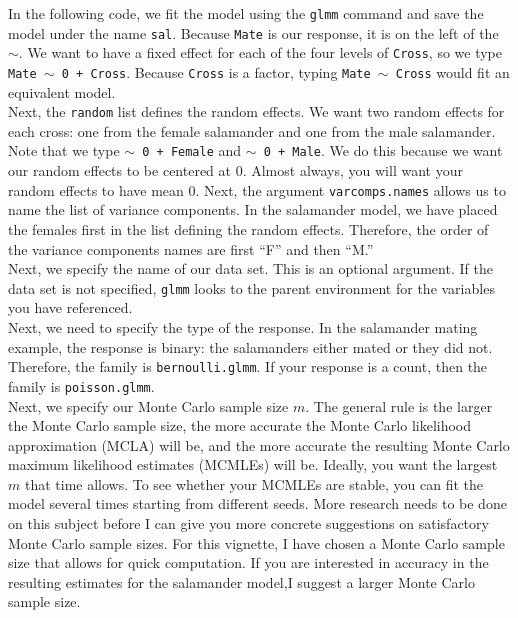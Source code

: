 \documentclass[11pt]{article}\usepackage[]{graphicx}\usepackage[]{color}
\begin{document}
In the following code, we  fit the model using the \texttt{glmm} command and save the model under the name  \texttt{sal}. Because \texttt{Mate} is our response, it is on the left of the $\sim$. We want to have a fixed effect for each of the four levels of \texttt{Cross}, so we type \texttt{Mate $\sim$ 0 + Cross}. Because \texttt{Cross} is a factor, typing \texttt{Mate $\sim$ Cross} would fit an equivalent model. \\ 

Next, the \texttt{random} list defines the random effects. We want two random effects for each cross: one from the female salamander and one from the male salamander. Note that we type \texttt{$\sim$ 0 + Female} and \texttt{$\sim$ 0 + Male}. We do this because we want our random effects to be centered at 0. Almost always, you will want your random effects to have mean 0.  Next, the argument \texttt{varcomps.names} allows us to name the list of variance components. In the salamander model, we have placed the females first in the list defining the random effects. Therefore, the order of the variance components names are first ``F'' and then ``M.''  \\

 Next, we specify the name of our data set. This is an optional argument. If the data set is not specified, \texttt{glmm} looks to the parent environment for the variables you have referenced. \\

Next, we need to specify the type of the response. In the salamander mating example, the response is binary: the salamanders either mated or they did not. Therefore, the family is \texttt{bernoulli.glmm}. If your response is a count, then the family is \texttt{poisson.glmm}.\\

Next, we specify our Monte Carlo sample size $m$. The general rule is the larger the Monte Carlo sample size, the more accurate the Monte Carlo likelihood approximation (MCLA) will be, and the more accurate the resulting Monte Carlo maximum likelihood estimates (MCMLEs) will be. Ideally, you want the largest $m$ that time allows. To see whether your MCMLEs are stable, you can fit the model several times starting from different seeds. More research needs to be done on this subject before I can give you more concrete suggestions on satisfactory Monte Carlo sample sizes. For this vignette, I have chosen a Monte Carlo sample size that allows for quick computation. If you are interested in accuracy in the resulting estimates for the salamander model,I suggest a larger Monte Carlo sample size.  \\
\end{document}
